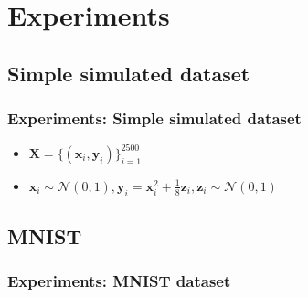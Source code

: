 


\beamertemplatenavigationsymbolsempty{}


\section{Experiments}   
\subsection{Simple simulated dataset}
\begin{frame}
\frametitle{Experiments: Simple simulated dataset}
\begin{itemize}
	\item[] $\mathbf{X}=\{(\mathbf{x}_i,\mathbf{y}_i)\}_{i=1}^{2500}$
	\item[] $\mathbf{x}_i\sim\mathcal{N}(0,1), \mathbf{y}_i= \mathbf{x}_i^2+\frac{1}{8}\mathbf{z}_i, \mathbf{z}_i\sim\mathcal{N}(0,1)$
\end{itemize}
\end{frame}
\subsection{MNIST}
\begin{frame}
\frametitle{Experiments: MNIST dataset}
\end{frame}
